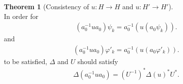 \documentclass{article}
\theoremstyle{definition}
\newtheorem{thm}[dfn]{Theorem}
\begin{document}
\begin{thm}[Consistency of $u: H\to H$ and $u: H'\to H'$]\label{thm:Consistency_HHprime}~\\
  In order for 
  \begin{align}
    (a_0^{-1} u a_0 ) \psi_k = a_0^{-1}(u (a_0 \psi_k)).
    \label{eq:consistency_transf_HHprime}
  \end{align}
  and
  \begin{align}
    (a_0^{-1} u a_0 ) \varphi'_k = a_0^{-1}(u (a_0 \varphi'_k)).
    \label{eq:consistency_transf_HHprime_varphi}
  \end{align}
  to be satisfied, $\Delta$ and $U$ should satisfy 
  \begin{align}
    \Delta(a_0^{-1} u a_0) = (U^{-1})^* \Delta(u)^* U^*.
    \label{eq:Delta_am1ua}
  \end{align}
\end{thm}
\end{document}

